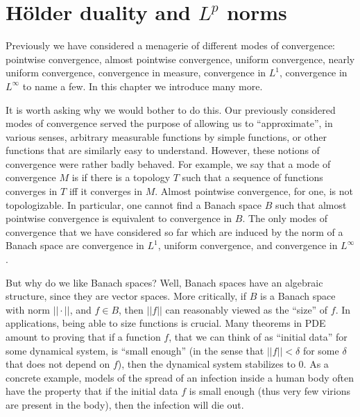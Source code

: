 \chapter{H\"older duality and $L^{p}$ norms}
Previously we have considered a menagerie of different modes of convergence: pointwise convergence, almost pointwise convergence, uniform convergence, nearly uniform convergence, convergence in measure, convergence in $L^{1}$, convergence in $L^{\infty}$ to name a few.
In this chapter we introduce many more.

It is worth asking why we would bother to do this.
Our previously considered modes of convergence served the purpose of allowing us to ``approximate'', in various senses, arbitrary measurable functions by simple functions, or other functions that are similarly easy to understand.
However, these notions of convergence were rather badly behaved.
For example, we say that a mode of convergence $M$ is  if there is a topology $T$ such that a sequence of functions converges in $T$ iff it converges in $M$.
Almost pointwise convergence, for one, is not topologizable.
In particular, one cannot find a Banach space $B$ such that almost pointwise convergence is equivalent to convergence in $B$.
The only modes of convergence that we have considered so far which are induced by the norm of a Banach space are convergence in $L^{1}$, uniform convergence, and convergence in $L^{\infty}$.

But why do we like Banach spaces? Well, Banach spaces have an algebraic structure, since they are vector spaces.
More critically, if $B$ is a Banach space with norm $||\cdot||$, and $f \in B$, then $||f||$ can reasonably viewed as the ``size'' of $f$.
In applications, being able to size functions is crucial.
Many theorems in PDE amount to proving that if a function $f$, that we can think of as ``initial data'' for some dynamical system, is ``small enough'' (in the sense that $||f|| < \delta$ for some $\delta$ that does not depend on $f$), then the dynamical system stabilizes to $0$.
As a concrete example, models of the spread of an infection inside a human body often have the property that if the initial data $f$ is small enough (thus very few virions are present in the body), then the infection will die out.


